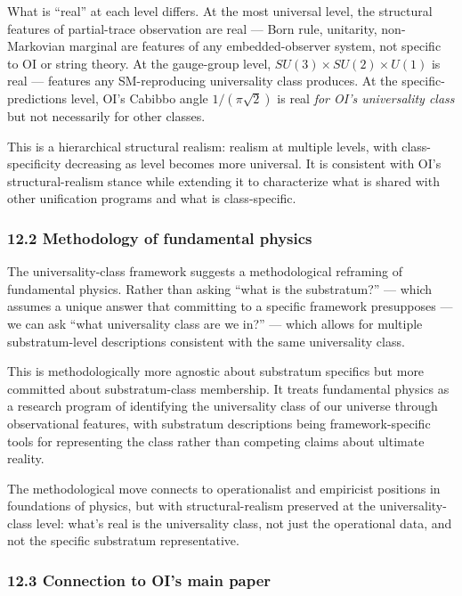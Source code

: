 \documentclass[
]{article}
\begin{document}
What is ``real'' at each level differs. At the most universal level, the
structural features of partial-trace observation are real --- Born rule,
unitarity, non-Markovian marginal are features of any embedded-observer
system, not specific to OI or string theory. At the gauge-group level,
\(SU(3) \times SU(2) \times U(1)\) is real --- features any
SM-reproducing universality class produces. At the specific-predictions
level, OI's Cabibbo angle \(1/(\pi\sqrt{2})\) is real \emph{for OI's
universality class} but not necessarily for other classes.

This is a hierarchical structural realism: realism at multiple levels,
with class-specificity decreasing as level becomes more universal. It is
consistent with OI's structural-realism stance while extending it to
characterize what is shared with other unification programs and what is
class-specific.

\hypertarget{methodology-of-fundamental-physics}{%
\subsubsection{12.2 Methodology of fundamental
physics}\label{methodology-of-fundamental-physics}}

The universality-class framework suggests a methodological reframing of
fundamental physics. Rather than asking ``what is the substratum?'' ---
which assumes a unique answer that committing to a specific framework
presupposes --- we can ask ``what universality class are we in?'' ---
which allows for multiple substratum-level descriptions consistent with
the same universality class.

This is methodologically more agnostic about substratum specifics but
more committed about substratum-class membership. It treats fundamental
physics as a research program of identifying the universality class of
our universe through observational features, with substratum
descriptions being framework-specific tools for representing the class
rather than competing claims about ultimate reality.

The methodological move connects to operationalist and empiricist
positions in foundations of physics, but with structural-realism
preserved at the universality-class level: what's real is the
universality class, not just the operational data, and not the specific
substratum representative.

\hypertarget{connection-to-ois-main-paper}{%
\subsubsection{12.3 Connection to OI's main
paper}\label{connection-to-ois-main-paper}}
\end{document}
